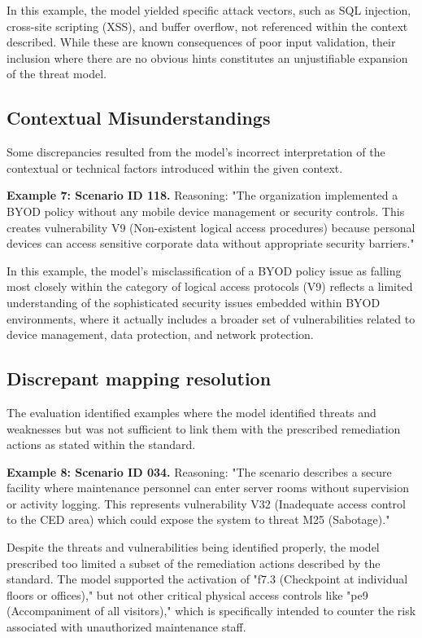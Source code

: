 \documentclass[sigconf]{acmart}
\begin{document}
In this example, the model yielded specific attack vectors, such as SQL injection, cross-site scripting (XSS), and buffer overflow, not referenced within the context described. While these are known consequences of poor input validation, their inclusion where there are no obvious hints constitutes an unjustifiable expansion of the threat model.

\subsection{Contextual Misunderstandings}
Some discrepancies resulted from the model's incorrect interpretation of the contextual or technical factors introduced within the given context.

\textbf{Example 7: Scenario ID 118.} Reasoning: "The organization implemented a BYOD policy without any mobile device management or security controls. This creates vulnerability V9 (Non-existent logical access procedures) because personal devices can access sensitive corporate data without appropriate security barriers."

In this example, the model's misclassification of a BYOD policy issue as falling most closely within the category of logical access protocols (V9) reflects a limited understanding of the sophisticated security issues embedded within BYOD environments, where it actually includes a broader set of vulnerabilities related to device management, data protection, and network protection.

\subsection{Discrepant mapping resolution}
The evaluation identified examples where the model identified threats and weaknesses but was not sufficient to link them with the prescribed remediation actions as stated within the standard.

\textbf{Example 8: Scenario ID 034.} Reasoning: "The scenario describes a secure facility where maintenance personnel can enter server rooms without supervision or activity logging. This represents vulnerability V32 (Inadequate access control to the CED area) which could expose the system to threat M25 (Sabotage)."

Despite the threats and vulnerabilities being identified properly, the model prescribed too limited a subset of the remediation actions described by the standard. The model supported the activation of "f7.3 (Checkpoint at individual floors or offices)," but not other critical physical access controls like "pe9 (Accompaniment of all visitors)," which is specifically intended to counter the risk associated with unauthorized maintenance staff.
\end{document}
